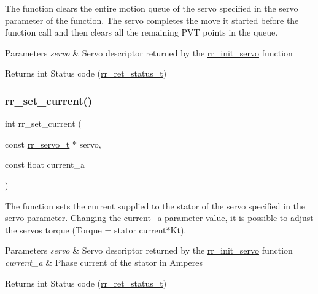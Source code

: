 The function clears the entire motion queue of the servo specified in the \textquotesingle{}servo\textquotesingle{} parameter of the function. The servo completes the move it started before the function call and then clears all the remaining P\+VT points in the queue. 


\begin{DoxyParams}{Parameters}
{\em servo} & Servo descriptor returned by the \hyperlink{group___common_ga0adb313a3eeb8a4399431e940a1f3e9e}{rr\+\_\+init\+\_\+servo} function \\
\hline
\end{DoxyParams}
\begin{DoxyReturn}{Returns}
int Status code (\hyperlink{api_8h_a92d5be5038abcf89837faf85a08debdc}{rr\+\_\+ret\+\_\+status\+\_\+t}) 
\end{DoxyReturn}
\mbox{\label{group___servo__control_gac25d20b331b1b985c1f6f50106d5c971}} 
\subsubsection{\texorpdfstring{rr\+\_\+set\+\_\+current()}{rr\_set\_current()}}
{\footnotesize\ttfamily int rr\+\_\+set\+\_\+current (\begin{DoxyParamCaption}\item[{const \hyperlink{structrr__servo__t}{rr\+\_\+servo\+\_\+t} $\ast$}]{servo,  }\item[{const float}]{current\+\_\+a }\end{DoxyParamCaption})}



The function sets the current supplied to the stator of the servo specified in the \textquotesingle{}servo\textquotesingle{} parameter. Changing the \textquotesingle{}current\+\_\+a parameter\textquotesingle{} value, it is possible to adjust the servo\textquotesingle{}s torque (Torque = stator current$\ast$\+Kt). 


\begin{DoxyParams}{Parameters}
{\em servo} & Servo descriptor returned by the \hyperlink{group___common_ga0adb313a3eeb8a4399431e940a1f3e9e}{rr\+\_\+init\+\_\+servo} function \\
\hline
{\em current\+\_\+a} & Phase current of the stator in Amperes \\
\hline
\end{DoxyParams}
\begin{DoxyReturn}{Returns}
int Status code (\hyperlink{api_8h_a92d5be5038abcf89837faf85a08debdc}{rr\+\_\+ret\+\_\+status\+\_\+t}) 
\end{DoxyReturn}
\mbox{\label{group___servo__control_ga67890b1af333ce15f291a24ddc5760d1}} 
